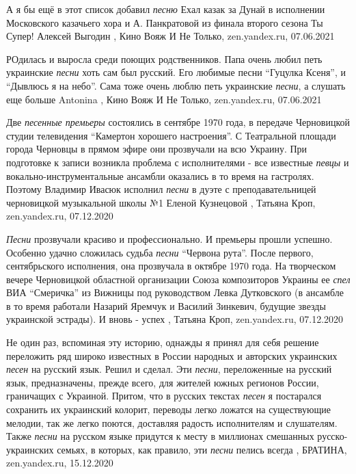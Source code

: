 А я бы ещё в этот список добавил \emph{песню} Ехал казак за Дунай в исполнении
Московского казачьего хора и А. Панкратовой из финала второго сезона Ты Супер!
Алексей Выгодин
, 
Кино Вояж И Не Только, zen.yandex.ru, 07.06.2021

РОдилась и выросла среди поющих родственников. Папа очень любил петь украинские
\emph{песни} хоть сам был русский. Его любимые песни \enquote{Гуцулка Ксеня}, и \enquote{Дывлюсь я на
небо}. Сама тоже очень люблю петь украинские \emph{песни}, а слушать еще больше
Antonina
, 
Кино Вояж И Не Только, zen.yandex.ru, 07.06.2021

Две \emph{песенные премьеры} состоялись в сентябре 1970 года, в передаче Черновицкой
студии телевидения \enquote{Камертон хорошего настроения}. С Театральной площади города
Черновцы в прямом эфире они прозвучали на всю Украину.  При подготовке к записи
возникла проблема с исполнителями - все известные\emph{ певцы} и
вокально-инструментальные ансамбли оказались в то время на гастролях. Поэтому
Владимир Ивасюк исполнил \emph{песни} в дуэте с преподавательницей черновицкой
музыкальной школы №1 Еленой Кузнецовой
, 
Татьяна Кроп, zen.yandex.ru, 07.12.2020

\emph{Песни} прозвучали красиво и профессионально. И премьеры прошли успешно. Особенно
удачно сложилась судьба \emph{песни} \enquote{Червона рута}. После первого, сентябрьского
исполнения, она прозвучала в октябре 1970 года. На творческом вечере
Черновицкой областной организации Союза композиторов Украины ее \emph{спел} ВИА
\enquote{Смеричка} из Вижницы под руководством Левка Дутковского (в ансамбле в то время
работали Назарий Яремчук и Василий Зинкевич, будущие звезды украинской
эстрады). И вновь - успех
, 
Татьяна Кроп, zen.yandex.ru, 07.12.2020

Не один раз, вспоминая эту историю, однажды я принял для себя решение
переложить ряд широко известных в России народных и авторских украинских \emph{песен}
на русский язык. Решил и сделал.  Эти \emph{песни}, переложенные на русский язык,
предназначены, прежде всего, для жителей южных регионов России, граничащих с
Украиной. Притом, что в русских текстах \emph{песен} я постарался сохранить их
украинский колорит, переводы легко ложатся на существующие мелодии, так же
легко поются, доставляя радость исполнителям и слушателям.  Также \emph{песни} на
русском языке придутся к месту в миллионах смешанных русско-украинских семьях,
в которых, как правило, эти \emph{песни} пелись всегда
, 
БРАТИНА, zen.yandex.ru, 15.12.2020

